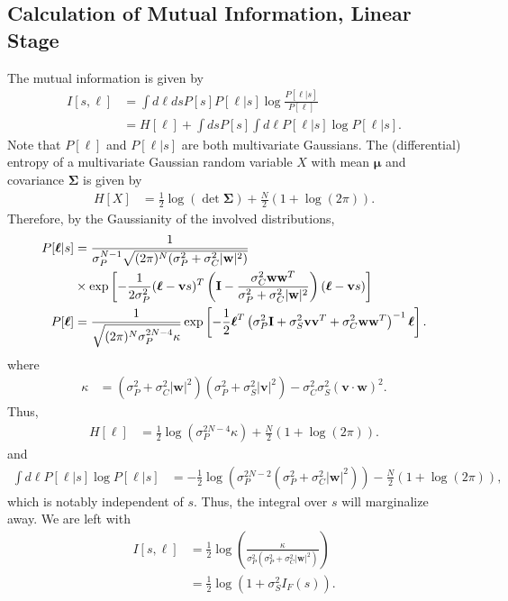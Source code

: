 \documentclass[12pt]{article}
\begin{document}
\subsection{Calculation of Mutual Information, Linear Stage}
\label{mutual-linear}
The mutual information is given by 
	\begin{align}
	I[s, \boldsymbol{\ell}] &= \int d\boldsymbol{\ell} ds  P[s] P[\boldsymbol{\ell}|s]\log \frac{P[\boldsymbol{\ell}|s]}{P[\boldsymbol{\ell}]} \\
	&= H[\boldsymbol{\ell}] + \int ds P[s] \int d\boldsymbol{\ell} P[\boldsymbol{\ell}|s] \log P[\boldsymbol{\ell}|s].
\end{align}
Note that $P[\boldsymbol{\ell}]$ and $P[\boldsymbol{\ell}|s]$ are both multivariate Gaussians. The (differential) entropy of a multivariate Gaussian random variable $X$ with mean $\boldsymbol{\mu}$ and covariance $\boldsymbol{\Sigma}$ is given by
\begin{align}
	H[X] &= \frac{1}{2} \log \left(\det\boldsymbol{\Sigma}\right) + \frac{N}{2} (1 + \log(2\pi)).
\end{align}
Therefore, by the Gaussianity of the involved distributions, 
\begin{align}
	P[\boldsymbol{\ell}|s] &= \frac{1}{\sigma_P^{N-1} \sqrt{(2\pi)^N(\sigma_P^2 + \sigma_C^2 |\mathbf{w}|^2)}} \notag \\
	& \times \exp\left[-\frac{1}{2\sigma_P^2} (\boldsymbol{\ell} - \mathbf{v}s)^T\left(\mathbf{I} - \frac{\sigma_C^2 \mathbf{ww}^T}{\sigma_P^2 + \sigma_C^2 |\mathbf{w}|^2}\right) (\boldsymbol{\ell} - \mathbf{v}s) \right] \\
	P[\boldsymbol{\ell}] &= \frac{1}{ \sqrt{(2\pi)^N \sigma_P^{2N-4}\kappa}} \exp\left[-\frac{1}{2}\boldsymbol{\ell}^T \left(\sigma_P^2 \mathbf{I} + \sigma_S^2 \mathbf{vv}^T + \sigma_C^2 \mathbf{ww}^T\right)^{-1} \boldsymbol{\ell}\right].
\end{align}
where 
\begin{align}
	\kappa &= (\sigma_P^2 + \sigma_C^2 |\mathbf{w}|^2)(\sigma_P^2 + \sigma_S^2 |\mathbf{v}|^2) - \sigma_C^2 \sigma_S^2 (\mathbf{v}\cdot\mathbf{w})^2.
\end{align}
Thus,
\begin{align}
	H[\boldsymbol{\ell}] &= \frac{1}{2}\log\left( \sigma_P^{2N-4} \kappa\right) + \frac{N}{2}(1 + \log(2\pi)).
\end{align}
and 
\begin{align}
	\int d\boldsymbol{\ell} P[\boldsymbol{\ell}|s] \log P[\boldsymbol{\ell}|s] &= -\frac{1}{2}\log(\sigma_P^{2N-2} (\sigma_P^2 +\sigma_C^2 |\mathbf{w}|^2)) - \frac{N}{2} (1+\log(2\pi)),
\end{align}
which is notably independent of $s$. Thus, the integral over $s$ will marginalize away. We are left with
\begin{align}
	I[s,\boldsymbol{\ell}] &= \frac{1}{2}\log\left(\frac{\kappa}{\sigma_P^2 (\sigma_P^2 + \sigma_C^2 |\mathbf{w}|^2)}\right) \\
	&= \frac{1}{2} \log \left(1 + \sigma_S^2 I_F(s)\right).
\end{align}
\end{document}
